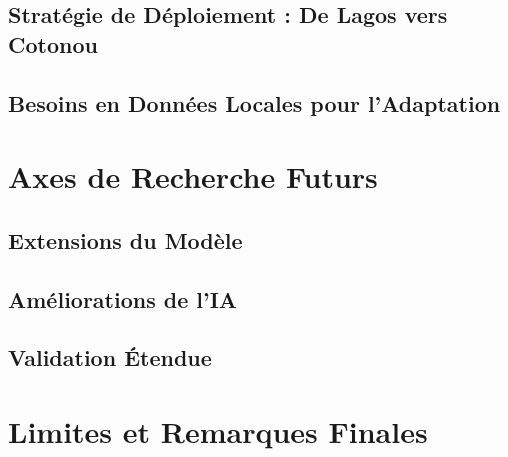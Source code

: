 \subsection{Stratégie de Déploiement : De Lagos vers Cotonou}


\subsection{Besoins en Données Locales pour l'Adaptation}

\section{Axes de Recherche Futurs}
\subsection{Extensions du Modèle}

\subsection{Améliorations de l'IA}

\subsection{Validation Étendue}

\section{Limites et Remarques Finales}
